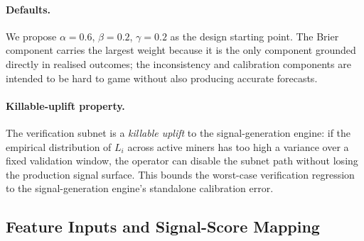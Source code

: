 \documentclass[journal]{IEEEtran}
\begin{document}
\paragraph*{Defaults.}
We propose $\alpha = 0.6$, $\beta = 0.2$, $\gamma = 0.2$ as the design
starting point. The Brier component carries the largest weight because
it is the only component grounded directly in realised outcomes; the
inconsistency and calibration components are intended to be hard to
game without also producing accurate forecasts.

\paragraph*{Killable-uplift property.}
The verification subnet is a \emph{killable uplift} to the
signal-generation engine: if the empirical distribution of $L_i$ across
active miners has too high a variance over a fixed validation window,
the operator can disable the subnet path without losing the production
signal surface. This bounds the worst-case verification regression to
the signal-generation engine's standalone calibration error.

\subsection{Feature Inputs and Signal-Score Mapping}\label{sec:vri:features}
\end{document}
